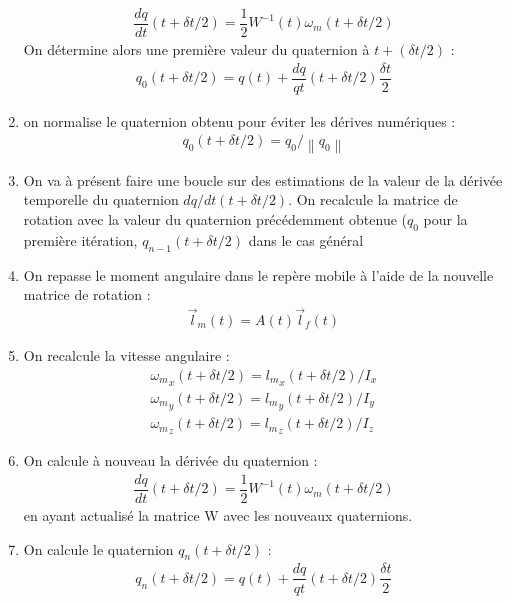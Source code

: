 \documentclass[12pt]{article}
\begin{document}
\begin{enumerate}
\begin{eqnarray}
\dfrac{dq}{dt}\left(t+\delta t/2\right)=\dfrac{1}{2}W^{-1}\left(t\right) \omega_m\left(t+\delta t/2\right)
\end{eqnarray}
On détermine alors une première valeur du quaternion à $t+\left( \delta t/2\right)$ :
\begin{eqnarray}
q_0\left(t+\delta t/2\right)=q\left(t\right)+\dfrac{dq}{qt}\left(t+\delta t/2\right)\dfrac{\delta t}{2}
\end{eqnarray}
\item on normalise le quaternion obtenu pour éviter les dérives numériques :
\begin{eqnarray}
q_0\left(t+\delta t/2\right)=q_0/ \left\| q_0\right\|
\end{eqnarray}
\item On va à présent faire une boucle sur des estimations de la valeur de la dérivée temporelle du quaternion $dq/dt\left(t+\delta t/2\right)$. On recalcule la matrice de rotation avec la valeur du quaternion précédemment obtenue ($q_0$ pour la première itération, $q_{n-1}\left(t+\delta t/2\right)$ dans le cas général
\item On repasse le moment angulaire dans le repère mobile à l'aide de la nouvelle matrice de rotation :
\begin{eqnarray}
\vec{l}_m\left(t\right)=A\left(t\right)\vec{l}_f\left(t\right)
\end{eqnarray}
\item On recalcule la vitesse angulaire :
\begin{eqnarray}
{\omega_m}_x\left(t+\delta t/2\right)={l_m}_x\left(t+\delta t/2\right)/I_x \nonumber \\
{\omega_m}_y\left(t+\delta t/2\right)={l_m}_y\left(t+\delta t/2\right)/I_y \\
{\omega_m}_z\left(t+\delta t/2\right)={l_m}_z\left(t+\delta t/2\right)/I_z
\end{eqnarray}
\item On calcule à nouveau la dérivée du quaternion :
\begin{eqnarray}
\dfrac{dq}{dt}\left(t+\delta t/2\right)=\dfrac{1}{2}W^{-1}\left(t\right) \omega_m\left(t+\delta t/2\right)
\end{eqnarray}
en ayant actualisé la matrice W avec les nouveaux quaternions.
\item On calcule le quaternion $q_n\left(t+\delta t/2\right)$ :
\begin{eqnarray}
q_n\left(t+\delta t/2\right)=q\left(t\right)+\dfrac{dq}{qt}\left(t+\delta t/2\right)\dfrac{\delta t}{2}

\end{eqnarray}
\end{enumerate}
\end{document}
